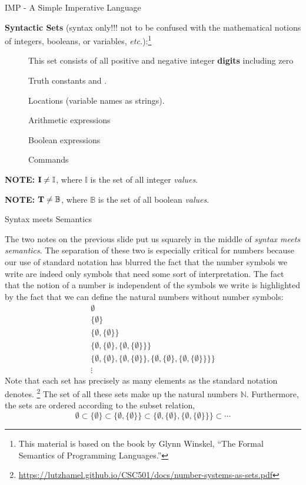 \documentclass{beamer}
\begin{document}
\begin{frame}{IMP - A Simple Imperative Language}

{\bf Syntactic Sets} (syntax only!!! not to be confused with the mathematical notions of integers, booleans, or variables, {\it etc.}):\footnote{This material is based on the book by Glynn Winskel, ``The Formal Semantics
of Programming Languages.''}
\begin{description}
\item[] This set consists of all positive and negative integer {\bf digits} including zero
\item[] Truth constants  and .
\item[] Locations (variable names as strings).
\item[] Arithmetic expressions
\item[] Boolean expressions
\item[] Commands
\end{description}

{\bf NOTE:} $\mbox{\bf I} \ne \mathbb{I}$, where $\mathbb{I}$ is the set of all integer {\em values}.

{\bf NOTE:} $\mbox{\bf T} \ne \mathbb{B}$, where $\mathbb{B}$ is the set of all boolean {\em values}.

\end{frame}

\begin{frame}{Syntax meets Semantics}
\scriptsize

The two notes on the previous slide put us squarely in the middle of {\em syntax meets semantics}.  The separation
of these two is especially critical for numbers because our use of standard notation has blurred the fact that the number
symbols we write are indeed only symbols that need some sort of interpretation.  The fact that the notion of a number is
independent of the symbols we write is highlighted by the fact that we can define the natural numbers without number symbols:
\[
\begin{array}{l}
\emptyset \\
\{\emptyset \} \\
\{ \emptyset , \{\emptyset \} \}\\
\{ \emptyset , \{\emptyset \}, \{ \emptyset , \{\emptyset \} \} \}\\
\{ \emptyset , \{\emptyset \}, \{ \emptyset , \{\emptyset \} \} , \{ \emptyset , \{\emptyset \}, \{ \emptyset , \{\emptyset \} \} \}\}\\
\vdots
\end{array}
\]
Note that each set has precisely as many elements as the standard notation denotes.
\footnote{\tiny\url{https://lutzhamel.github.io/CSC501/docs/number-systems-as-sets.pdf}}  
The set of all these sets make up the natural numbers $\mathbb{N}$.
Furthermore, the sets are ordered according to the subset relation,
\[
\emptyset \subset \{\emptyset \} \subset \{ \emptyset , \{\emptyset \} \} \subset \{ \emptyset , \{\emptyset \}, \{ \emptyset , \{\emptyset \} \} \} \subset \cdots
\]

\end{frame}
\end{document}
